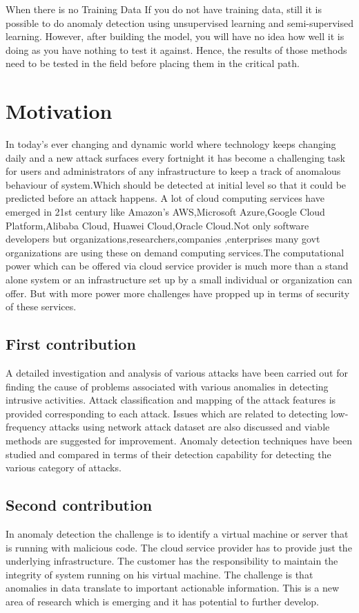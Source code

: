 When there is no Training Data
If you do not have training data, still it is possible to do anomaly detection using unsupervised learning and semi-supervised learning. However, after building the model, you will have no idea how well it is doing as you have nothing to test it against. Hence, the results of those methods need to be tested in the field before placing them in the critical path.
\section{Motivation}
In today's ever changing and dynamic world where technology keeps changing daily and a new attack surfaces every fortnight  it has become a challenging task for users and administrators of any infrastructure to keep a track of anomalous behaviour of system.Which should be detected at initial level so that it could be predicted before an attack happens. A lot of cloud computing services have emerged in 21st century like Amazon's AWS,Microsoft Azure,Google Cloud Platform,Alibaba Cloud, Huawei Cloud,Oracle Cloud.Not only software developers but organizations,researchers,companies ,enterprises many govt organizations are using  these  on demand computing services.The computational power which can be offered via cloud service provider is much more than a stand alone system or an infrastructure set up by a small individual or organization can offer. But with more power more challenges have propped up in terms of security of these services.

\subsection{First contribution} 
A detailed investigation and analysis of various attacks  have been carried out for finding the cause of problems associated with various anomalies in detecting intrusive activities. Attack classification and mapping of the attack features is provided corresponding to each attack. Issues which are related to detecting low-frequency attacks using network attack dataset are also discussed and viable methods are suggested for improvement. Anomaly detection techniques have been studied and compared in terms of their detection capability for detecting the various category of attacks.
\subsection{Second contribution} 
In anomaly detection the challenge is to identify a virtual machine or server that is running with malicious code. The cloud service provider has to provide just the underlying infrastructure. The customer has the responsibility to maintain the integrity of system running on his virtual machine.
The challenge is that anomalies in data translate to important actionable information. This is a new area of research which is emerging and it has potential to further develop.


